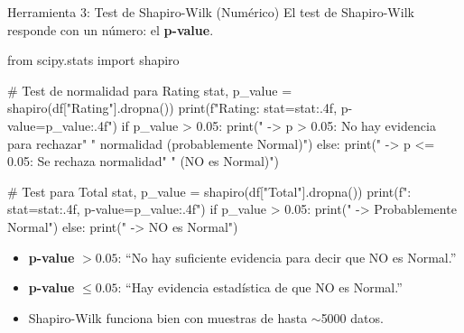 \documentclass[aspectratio=169, 11pt]{beamer}
\begin{document}
\begin{frame}[fragile,shrink=28]{Herramienta 3: Test de Shapiro-Wilk (Numérico)}
  \vspace{-6pt}
  {\footnotesize
    El test de Shapiro-Wilk responde con un número: el \textbf{p-value}.}

  \vspace{4pt}
  \begin{pyblock}
from scipy.stats import shapiro

# Test de normalidad para Rating
stat, p_value = shapiro(df["Rating"].dropna())
print(f"Rating:  stat={stat:.4f}, p-value={p_value:.4f}")
if p_value > 0.05:
    print("  -> p > 0.05: No hay evidencia para rechazar"
          " normalidad (probablemente Normal)")
else:
    print("  -> p <= 0.05: Se rechaza normalidad"
          " (NO es Normal)")

# Test para Total
stat, p_value = shapiro(df["Total"].dropna())
print(f"\nTotal:   stat={stat:.4f}, p-value={p_value:.4f}")
if p_value > 0.05:
    print("  -> Probablemente Normal")
else:
    print("  -> NO es Normal")
  \end{pyblock}

  \vspace{4pt}
  {\scriptsize\color{textMuted}
  \begin{itemize}\setlength{\itemsep}{3pt}
    \item[{\color{arcaRed}\scriptsize\faArrowRight}]
      \textbf{p-value} $> 0.05$: ``No hay suficiente evidencia para decir que NO es Normal.''
    \item[{\color{arcaRed}\scriptsize\faArrowRight}]
      \textbf{p-value} $\leq 0.05$: ``Hay evidencia estadística de que NO es Normal.''
    \item[{\color{textMuted}\scriptsize\faLightbulb}]
      Shapiro-Wilk funciona bien con muestras de hasta $\sim$5000 datos.
  \end{itemize}
  }
\end{frame}
\end{document}
